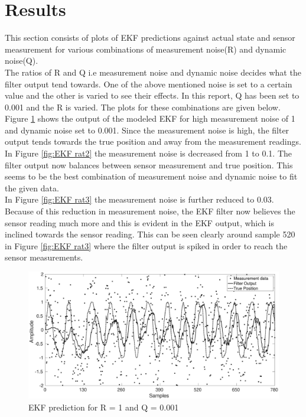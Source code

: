 \documentclass[12pt]{article}
\begin{document}
\newpage
\section{Results}
This section consists of plots of EKF predictions against actual state and sensor measurement for various combinations of measurement noise(R) and dynamic noise(Q).  \\

The ratios of R and Q i.e measurement noise and dynamic noise decides what the filter output tend towards. One of the above mentioned noise is set to a certain value and the other is varied to see their effects. In this report, Q has been set to 0.001 and the R is varied. The plots for these combinations are given below. \\

Figure \ref{fig:EKF rat1} shows the output of the modeled EKF for high measurement noise of 1 and dynamic noise set to 0.001. Since the measurement noise is high, the filter output tends towards the true position and away from the measurement readings. \\

In Figure \ref{fig:EKF rat2} the measurement noise is decreased from 1 to 0.1. The filter output now balances between sensor measurement and true position. This seems to be the best combination of measurement noise and dynamic noise to fit the given data.\\

In Figure \ref{fig:EKF rat3} the measurement noise is further reduced to 0.03. Because of this reduction in measurement noise, the EKF filter now believes the sensor reading much more and this is evident in the EKF output, which is 
inclined towards the sensor reading. This can be seen clearly around sample 520 in Figure \ref{fig:EKF rat3} where the filter output is spiked in order to reach the sensor measurements. \\

\begin{figure}[b!]
\centering
	\includegraphics[width = \textwidth]{./Figures/ratio1.eps}
	\caption{EKF prediction for R = 1 and Q = 0.001}
	\label{fig:EKF rat1}
\end{figure}
\end{document}
